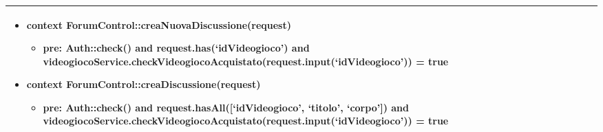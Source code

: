 \begin{tabular}{|| l | p{34em} ||}
\begin{itemize}[leftmargin=*]
	\item \textbf{context} ForumControl::creaNuovaDiscussione(request)
	\begin{itemize}
		\item[ ] \textbf{pre:} Auth::check()
		and request.has(‘idVideogioco’)
		and videogiocoService.checkVideogiocoAcquistato(request.input(‘idVideogioco’)) = true	
	\end{itemize}

	\item \textbf{context} ForumControl::creaDiscussione(request)
	\begin{itemize}
		\item[ ] \textbf{pre:} Auth::check()
		and request.hasAll([‘idVideogioco’, ‘titolo’, ‘corpo’])
		and videogiocoService.checkVideogiocoAcquistato(request.input(‘idVideogioco’)) = true	
	\end{itemize}

\end{itemize}\\
\hline
\end{tabular}

\newpage
